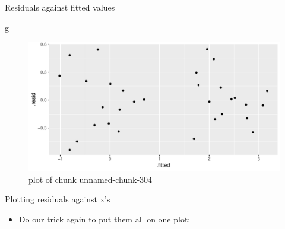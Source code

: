 \documentclass[ignorenonframetext,]{beamer}
\newenvironment{Shaded}{\begin{snugshade}}{\end{snugshade}}
\newcommand{\DataTypeTok}[1]{\textcolor[rgb]{0.13,0.29,0.53}{#1}}
\newcommand{\DecValTok}[1]{\textcolor[rgb]{0.00,0.00,0.81}{#1}}
\newcommand{\FloatTok}[1]{\textcolor[rgb]{0.00,0.00,0.81}{#1}}
\newcommand{\KeywordTok}[1]{\textcolor[rgb]{0.13,0.29,0.53}{\textbf{#1}}}
\newcommand{\NormalTok}[1]{#1}
\newcommand{\OperatorTok}[1]{\textcolor[rgb]{0.81,0.36,0.00}{\textbf{#1}}}
\newcommand{\StringTok}[1]{\textcolor[rgb]{0.31,0.60,0.02}{#1}}
\providecommand{\tightlist}{%
  \setlength{\itemsep}{0pt}\setlength{\parskip}{0pt}}
\begin{document}
\begin{frame}[fragile]{Residuals against fitted values}
\protect\hypertarget{residuals-against-fitted-values}{}

\begin{Shaded}
\begin{Highlighting}[]
\NormalTok{g}
\end{Highlighting}
\end{Shaded}

\begin{figure}
\centering
\includegraphics{figure/unnamed-chunk-304-1.pdf}
\caption{plot of chunk unnamed-chunk-304}
\end{figure}

\end{frame}

\begin{frame}[fragile]{Plotting residuals against x's}
\protect\hypertarget{plotting-residuals-against-xs}{}

\begin{itemize}
\tightlist
\item
  Do our trick again to put them all on one plot:
\end{itemize}

\begin{Shaded}
\end{Shaded}

\end{frame}
\end{document}
